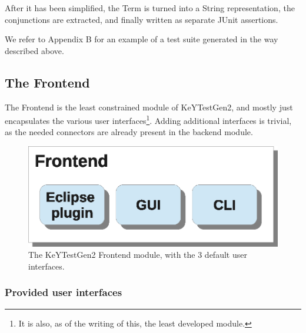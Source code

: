\documentclass{article}
\newenvironment{tmparmod}[3]{\begin{list}{}{\setlength{\topsep}{0pt}\setlength{\leftmargin}{#1}\setlength{\rightmargin}{#2}\setlength{\parindent}{#3}\setlength{\listparindent}{\parindent}\setlength{\itemindent}{\parindent}\setlength{\parsep}{\parskip}} \item[]}{\end{list}}
\begin{document}
After it has been simplified, the Term is turned into a String representation,
the conjunctions are extracted, and finally written as separate JUnit
assertions.



We refer to Appendix B for an example of a test suite generated in the way
described above.



\subsection{The Frontend}

The Frontend is the least constrained module of KeYTestGen2, and mostly just
encapsulates the various user interfaces{\footnote{It is also, as of the
writing of this, the least developed module.}}. Adding additional interfaces
is trivial, as the needed connectors are already present in the backend
module.



\begin{tmparmod}{2cm}{0pt}{0pt}
  \begin{tmparmod}{0pt}{2cm}{0pt}
    \begin{figure}[h]
      \includegraphics{Frontend_Architecture.eps}
      \caption{The KeYTestGen2 Frontend module, with the 3 default user
      interfaces.}
    \end{figure}
  \end{tmparmod}
\end{tmparmod}



\subsubsection{Provided user interfaces}
\end{document}
